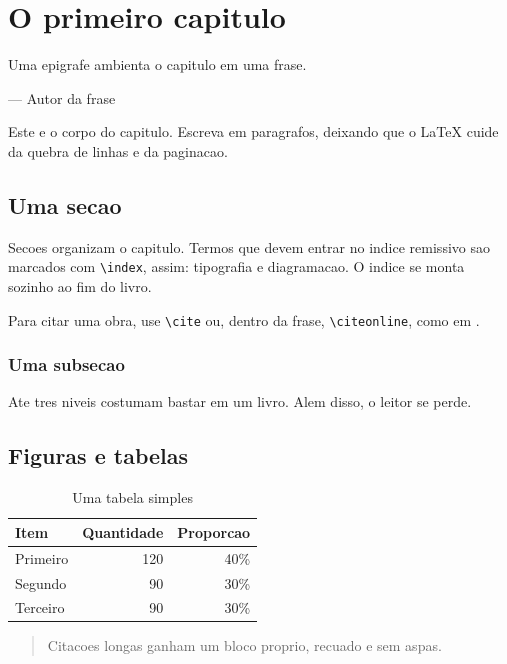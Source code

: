 \chapter{O primeiro capitulo}
\label{cap:primeiro}

\epigraph{Uma epigrafe ambienta o capitulo em uma frase.}{--- \textup{Autor da frase}}

Este e o corpo do capitulo. Escreva em paragrafos, deixando que o LaTeX cuide da
quebra de linhas e da paginacao.

\section{Uma secao}
\label{sec:primeira}

Secoes organizam o capitulo. Termos que devem entrar no indice remissivo sao
marcados com \verb|\index|, assim: tipografia e
diagramacao. O indice se monta sozinho ao fim do livro.

Para citar uma obra, use \verb|\cite| \cite{knuth1984} ou, dentro da frase,
\verb|\citeonline|, como em .

\subsection{Uma subsecao}

Ate tres niveis costumam bastar em um livro. Alem disso, o leitor se perde.

\section{Figuras e tabelas}
\label{sec:figuras-tabelas}

%

\begin{table}[htb]
  \centering
  \caption{Uma tabela simples}
  \label{tab:exemplo}
  \begin{tabular}{lrr}
    \toprule
    \textbf{Item} & \textbf{Quantidade} & \textbf{Proporcao} \\
    \midrule
    Primeiro  & 120 & 40\% \\
    Segundo   &  90 & 30\% \\
    Terceiro  &  90 & 30\% \\
    \bottomrule
  \end{tabular}
\end{table}

\begin{quote}
  Citacoes longas ganham um bloco proprio, recuado e sem aspas.
\end{quote}
